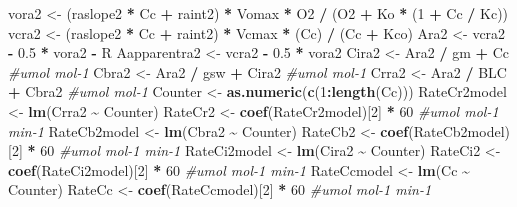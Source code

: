 \documentclass[
]{krantz}
\makeatletter
\newenvironment{Shaded}{\begin{snugshade}}{\end{snugshade}}
\newcommand{\CommentTok}[1]{\textcolor[rgb]{0.56,0.35,0.01}{\textit{#1}}}
\newcommand{\DecValTok}[1]{\textcolor[rgb]{0.00,0.00,0.81}{#1}}
\newcommand{\FloatTok}[1]{\textcolor[rgb]{0.00,0.00,0.81}{#1}}
\newcommand{\KeywordTok}[1]{\textcolor[rgb]{0.13,0.29,0.53}{\textbf{#1}}}
\newcommand{\NormalTok}[1]{#1}
\newcommand{\OperatorTok}[1]{\textcolor[rgb]{0.81,0.36,0.00}{\textbf{#1}}}
\newcommand{\StringTok}[1]{\textcolor[rgb]{0.31,0.60,0.02}{#1}}
\newenvironment{kframe}{%
\medskip{}
\setlength{\fboxsep}{.8em}
 \def\at@end@of@kframe{}%
 \ifinner\ifhmode%
  \def\at@end@of@kframe{\end{minipage}}%
  \begin{minipage}{\columnwidth}%
 \fi\fi%
 \def\FrameCommand##1{\hskip\@totalleftmargin \hskip-\fboxsep
 \colorbox{shadecolor}{##1}\hskip-\fboxsep
     \hskip-\linewidth \hskip-\@totalleftmargin \hskip\columnwidth}%
 \MakeFramed {\advance\hsize-\width
   \@totalleftmargin\z@ \linewidth\hsize
   \@setminipage}}%
 {\par\unskip\endMakeFramed%
 \at@end@of@kframe}
\renewenvironment{Shaded}{\begin{kframe}}{\end{kframe}}
\makeatother
\begin{document}
\begin{Shaded}
\begin{Highlighting}[]
\NormalTok{vora2 \textless{}{-}}
\StringTok{  }\NormalTok{(raslope2 }\OperatorTok{*}\StringTok{ }\NormalTok{Cc }\OperatorTok{+}\StringTok{ }\NormalTok{raint2) }\OperatorTok{*}\StringTok{ }\NormalTok{Vomax }\OperatorTok{*}\StringTok{ }\NormalTok{O2 }\OperatorTok{/}\StringTok{ }\NormalTok{(O2 }\OperatorTok{+}\StringTok{ }\NormalTok{Ko }\OperatorTok{*}\StringTok{ }\NormalTok{(}\DecValTok{1} \OperatorTok{+}\StringTok{ }\NormalTok{Cc }\OperatorTok{/}\StringTok{ }\NormalTok{Kc)) }
\NormalTok{vcra2 \textless{}{-}}\StringTok{ }\NormalTok{(raslope2 }\OperatorTok{*}\StringTok{ }\NormalTok{Cc }\OperatorTok{+}\StringTok{ }\NormalTok{raint2) }\OperatorTok{*}\StringTok{ }\NormalTok{Vcmax }\OperatorTok{*}\StringTok{ }\NormalTok{(Cc) }\OperatorTok{/}\StringTok{ }\NormalTok{(Cc }\OperatorTok{+}\StringTok{ }\NormalTok{Kco) }
\NormalTok{Ara2 \textless{}{-}}\StringTok{ }\NormalTok{vcra2 }\OperatorTok{{-}}\StringTok{ }\FloatTok{0.5} \OperatorTok{*}\StringTok{ }\NormalTok{vora2 }\OperatorTok{{-}}\StringTok{ }\NormalTok{R }
\NormalTok{Aapparentra2 \textless{}{-}}\StringTok{ }\NormalTok{vcra2 }\OperatorTok{{-}}\StringTok{ }\FloatTok{0.5} \OperatorTok{*}\StringTok{ }\NormalTok{vora2 }
\NormalTok{Cira2 \textless{}{-}}\StringTok{ }\NormalTok{Ara2 }\OperatorTok{/}\StringTok{ }\NormalTok{gm }\OperatorTok{+}\StringTok{ }\NormalTok{Cc }\CommentTok{\#umol mol{-}1}
\NormalTok{Cbra2 \textless{}{-}}\StringTok{ }\NormalTok{Ara2 }\OperatorTok{/}\StringTok{ }\NormalTok{gsw }\OperatorTok{+}\StringTok{ }\NormalTok{Cira2 }\CommentTok{\#umol mol{-}1}
\NormalTok{Crra2 \textless{}{-}}\StringTok{ }\NormalTok{Ara2 }\OperatorTok{/}\StringTok{ }\NormalTok{BLC }\OperatorTok{+}\StringTok{ }\NormalTok{Cbra2 }\CommentTok{\#umol mol{-}1}
\NormalTok{Counter \textless{}{-}}\StringTok{ }\KeywordTok{as.numeric}\NormalTok{(}\KeywordTok{c}\NormalTok{(}\DecValTok{1}\OperatorTok{:}\KeywordTok{length}\NormalTok{(Cc)))}
\NormalTok{RateCr2model \textless{}{-}}\StringTok{ }\KeywordTok{lm}\NormalTok{(Crra2 }\OperatorTok{\textasciitilde{}}\StringTok{ }\NormalTok{Counter)}
\NormalTok{RateCr2 \textless{}{-}}\StringTok{ }\KeywordTok{coef}\NormalTok{(RateCr2model)[}\DecValTok{2}\NormalTok{] }\OperatorTok{*}\StringTok{ }\DecValTok{60} \CommentTok{\#umol mol{-}1 min{-}1}
\NormalTok{RateCb2model \textless{}{-}}\StringTok{ }\KeywordTok{lm}\NormalTok{(Cbra2 }\OperatorTok{\textasciitilde{}}\StringTok{ }\NormalTok{Counter)}
\NormalTok{RateCb2 \textless{}{-}}\StringTok{ }\KeywordTok{coef}\NormalTok{(RateCb2model)[}\DecValTok{2}\NormalTok{] }\OperatorTok{*}\StringTok{ }\DecValTok{60} \CommentTok{\#umol mol{-}1 min{-}1}
\NormalTok{RateCi2model \textless{}{-}}\StringTok{ }\KeywordTok{lm}\NormalTok{(Cira2 }\OperatorTok{\textasciitilde{}}\StringTok{ }\NormalTok{Counter)}
\NormalTok{RateCi2 \textless{}{-}}\StringTok{ }\KeywordTok{coef}\NormalTok{(RateCi2model)[}\DecValTok{2}\NormalTok{] }\OperatorTok{*}\StringTok{ }\DecValTok{60} \CommentTok{\#umol mol{-}1 min{-}1}
\NormalTok{RateCcmodel \textless{}{-}}\StringTok{ }\KeywordTok{lm}\NormalTok{(Cc }\OperatorTok{\textasciitilde{}}\StringTok{ }\NormalTok{Counter)}
\NormalTok{RateCc \textless{}{-}}\StringTok{ }\KeywordTok{coef}\NormalTok{(RateCcmodel)[}\DecValTok{2}\NormalTok{] }\OperatorTok{*}\StringTok{ }\DecValTok{60} \CommentTok{\#umol mol{-}1 min{-}1}


\end{Highlighting}
\end{Shaded}
\end{document}
